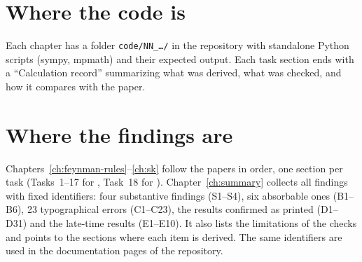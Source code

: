 \documentclass[11pt]{report}
\numberwithin{equation}{chapter}
\begin{document}
\section*{Where the code is}
Each chapter has a folder \texttt{code/NN\_\ldots/} in the repository with standalone Python scripts (sympy, mpmath) and their expected output.
Each task section ends with a ``Calculation record'' summarizing what was derived, what was checked, and how it compares with the paper.
\section*{Where the findings are}
Chapters~\ref{ch:feynman-rules}--\ref{ch:sk} follow the papers in order, one section per task (Tasks~1--17 for \PI, Task~18 for \PII).
Chapter~\ref{ch:summary} collects all findings with fixed identifiers: four substantive findings (S1--S4), six absorbable ones (B1--B6),
23 typographical errors (C1--C23), the results confirmed as printed (D1--D31) and the late-time results (E1--E10). It also lists the limitations of
the checks and points to the sections where each item is derived. The same identifiers are used in the documentation pages of the repository.



\end{document}
